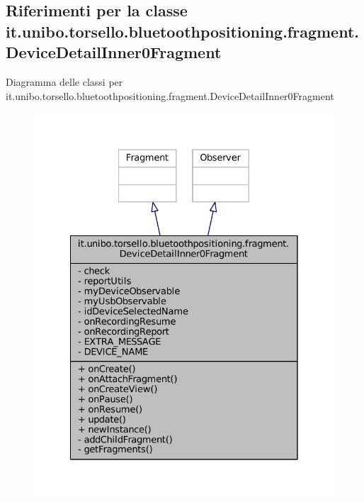 \hypertarget{classit_1_1unibo_1_1torsello_1_1bluetoothpositioning_1_1fragment_1_1DeviceDetailInner0Fragment}{}\subsection{Riferimenti per la classe it.\+unibo.\+torsello.\+bluetoothpositioning.\+fragment.\+Device\+Detail\+Inner0\+Fragment}
\label{classit_1_1unibo_1_1torsello_1_1bluetoothpositioning_1_1fragment_1_1DeviceDetailInner0Fragment}


Diagramma delle classi per it.\+unibo.\+torsello.\+bluetoothpositioning.\+fragment.\+Device\+Detail\+Inner0\+Fragment
\nopagebreak
\begin{figure}[H]
\begin{center}
\leavevmode
\includegraphics[width=328pt]{classit_1_1unibo_1_1torsello_1_1bluetoothpositioning_1_1fragment_1_1DeviceDetailInner0Fragment__inherit__graph}
\end{center}
\end{figure}


